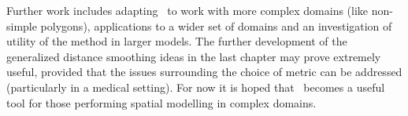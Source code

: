 Further work includes adapting \mdsds\ to work with more complex domains (like non-simple polygons), applications to a wider set of domains and an investigation of utility of the method in larger models. The further development of the generalized distance smoothing ideas in the last chapter may prove extremely useful, provided that the issues surrounding the choice of metric can be addressed (particularly in a medical setting). For now it is hoped that \mdsds\ becomes a useful tool for those performing spatial modelling in complex domains.

